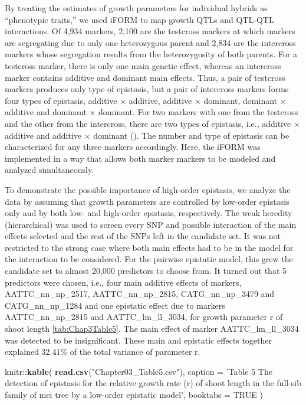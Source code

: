 \documentclass[11pt,]{book}
\newenvironment{Shaded}{\begin{snugshade}}{\end{snugshade}}
\newcommand{\KeywordTok}[1]{\textcolor[rgb]{0.13,0.29,0.53}{\textbf{{#1}}}}
\newcommand{\DataTypeTok}[1]{\textcolor[rgb]{0.13,0.29,0.53}{{#1}}}
\newcommand{\StringTok}[1]{\textcolor[rgb]{0.31,0.60,0.02}{{#1}}}
\newcommand{\OtherTok}[1]{\textcolor[rgb]{0.56,0.35,0.01}{{#1}}}
\newcommand{\NormalTok}[1]{{#1}}
\theoremstyle{definition}
\theoremstyle{definition}
\theoremstyle{remark}
\begin{document}
By treating the estimates of growth parameters for individual hybrids as
``phenotypic traits,'' we used iFORM to map growth QTLs and QTL-QTL
interactions. Of 4,934 markers, 2,100 are the testcross markers at which
markers are segregating due to only one heterozygous parent and 2,834
are the intercross markers whose segregation results from the
heterozygosity of both parents. For a testcross marker, there is only
one main genetic effect, whereas an intercross marker contains additive
and dominant main effects. Thus, a pair of testcross markers produces
only type of epistasis, but a pair of intercross markers forms four
types of epistasis, additive × additive, additive × dominant, dominant ×
additive and dominant × dominant. For two markers with one from the
testcross and the other from the intercross, there are two types of
epistasis, i.e., additive × additive and additive × dominant
(\cite{tong20113funmap}). The number and type of epistasis can be
characterized for any three markers accordingly. Here, the iFORM was
implemented in a way that allows both marker markers to be modeled and
analyzed simultaneously.

To demonstrate the possible importance of high-order epistasis, we
analyze the data by assuming that growth parameters are controlled by
low-order epistasis only and by both low- and high-order epistasis,
respectively. The weak heredity (hierarchical) was used to screen every
SNP and possible interaction of the main effects selected and the rest
of the SNPs left in the candidate set. It was not restricted to the
strong case where both main effects had to be in the model for the
interaction to be considered. For the pairwise epistatic model, this
grew the candidate set to almost 20,000 predictors to choose from. It
turned out that 5 predictors were chosen, i.e., four main additive
effects of markers, AATTC\_nn\_np\_2517, AATTC\_nn\_np\_2815,
CATG\_nn\_np\_3479 and CATG\_nn\_np\_1284 and one epistatic effect due
to markers AATTC\_nn\_np\_2815 and AATTC\_lm\_ll\_3034, for growth
parameter r of shoot length \ref{tab:Chap3Table5}. The main effect of
marker AATTC\_lm\_ll\_3034 was detected to be insignificant. These main
and epistatic effects together explained 32.41\% of the total variance
of parameter r.

\begin{Shaded}
\begin{Highlighting}[]
\NormalTok{knitr::}\KeywordTok{kable}\NormalTok{(}
  \KeywordTok{read.csv}\NormalTok{(}\StringTok{"Chapter03_Table5.csv"}\NormalTok{), }\DataTypeTok{caption =} \StringTok{'Table 5 The detection of epistasis for the relative growth rate (r) of shoot length in the full-sib family of mei tree by a low-order epistatic model'}\NormalTok{,}
  \DataTypeTok{booktabs =} \OtherTok{TRUE}
\NormalTok{)}
\end{Highlighting}
\end{Shaded}
\end{document}
